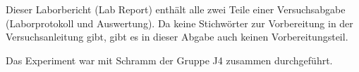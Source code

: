 \thispagestyle{plain}

Dieser Laborbericht (Lab Report) enthält alle zwei Teile einer Versuchsabgabe (Laborprotokoll und Auswertung). Da keine Stichwörter zur Vorbereitung in der Versuchsanleitung gibt, gibt es in dieser Abgabe auch keinen Vorbereitungsteil. 

Das Experiment war mit Schramm der Gruppe J4 zusammen durchgeführt. 